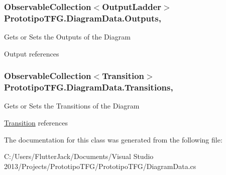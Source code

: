 \subsubsection[{Outputs}]{\setlength{\rightskip}{0pt plus 5cm}Observable\+Collection$<${\bf Output\+Ladder}$>$ Prototipo\+T\+F\+G.\+Diagram\+Data.\+Outputs\hspace{0.3cm}{\ttfamily [get]}, {\ttfamily [set]}}\label{class_prototipo_t_f_g_1_1_diagram_data_ad071878319be0edcbc7f92c7e189a2ba}


Gets or Sets the Outputs of the Diagram 

Output references\hypertarget{class_prototipo_t_f_g_1_1_diagram_data_adcc7d046268385bf8ed61820883e87b1}{}
\subsubsection[{Transitions}]{\setlength{\rightskip}{0pt plus 5cm}Observable\+Collection$<${\bf Transition}$>$ Prototipo\+T\+F\+G.\+Diagram\+Data.\+Transitions\hspace{0.3cm}{\ttfamily [get]}, {\ttfamily [set]}}\label{class_prototipo_t_f_g_1_1_diagram_data_adcc7d046268385bf8ed61820883e87b1}


Gets or Sets the Transitions of the Diagram 

\hyperlink{class_prototipo_t_f_g_1_1_transition}{Transition} references

The documentation for this class was generated from the following file\+:\begin{DoxyCompactItemize}
\item 
C\+:/\+Users/\+Flutter\+Jack/\+Documents/\+Visual Studio 2013/\+Projects/\+Prototipo\+T\+F\+G/\+Prototipo\+T\+F\+G/Diagram\+Data.\+cs\end{DoxyCompactItemize}
